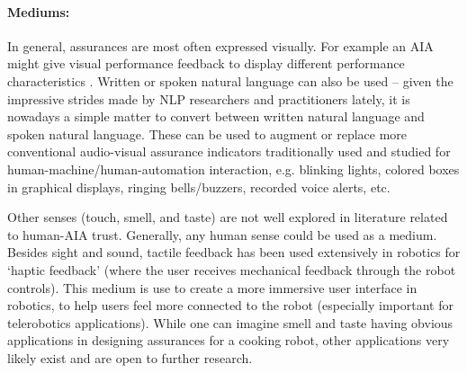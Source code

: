 \paragraph{Mediums:} In general, assurances are most often expressed visually. For example an AIA might give visual performance feedback to display different performance characteristics \cite{Chadalavada2015-wx,Muir1996-gt}. Written or spoken natural language can also be used \cite{Wang2016-id} -- given the impressive strides made by NLP researchers and practitioners lately, it is nowadays a simple matter to convert between written natural language and spoken natural language. 
These can be used to augment or replace more conventional audio-visual assurance indicators traditionally used and studied for human-machine/human-automation interaction, e.g. blinking lights, colored boxes in graphical displays, ringing bells/buzzers, recorded voice alerts, etc.
    
Other senses (touch, smell, and taste) are not well explored in literature related to human-AIA trust. Generally, any human sense could be used as a medium. Besides sight and sound, tactile feedback has been used extensively in robotics for `haptic feedback' (where the user receives mechanical feedback through the robot controls). This medium is use to create a more immersive user interface in robotics, to help users feel more connected to the robot (especially important for telerobotics applications). 
While one can imagine smell and taste having obvious applications in designing assurances for a cooking robot, other applications very likely exist and are open to further research.

